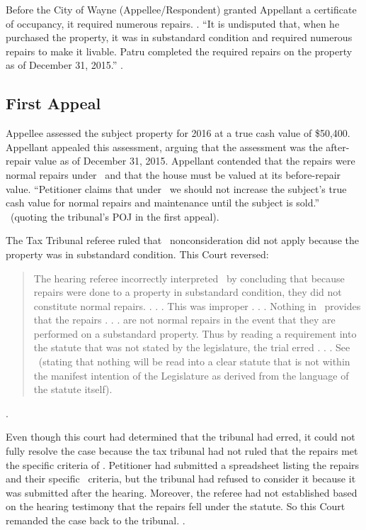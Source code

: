 \documentclass[12pt,\documentclassflag]{michiganCourtOfAppealsBrief}
\begin{document}
Before the City of Wayne (Appellee/Respondent) granted Appellant a certificate of occupancy, it required numerous repairs. \repairs. ``It is undisputed that, when he purchased the property, it was in substandard condition and required numerous repairs to make it livable. Patru completed the required repairs on the property as of December 31, 2015.'' .

\subsection{First Appeal}

Appellee assessed the subject property for 2016 at a true cash value of \$50,400. Appellant appealed this assessment, arguing that the assessment was the after-repair value as of December 31, 2015.
Appellant contended that the repairs were normal repairs under \mathieuGast\ and that the house must be valued at its before-repair value. 
``Petitioner claims that under \mathieuGast\ we should not increase the subject's true cash value for normal repairs and maintenance until the subject is sold.'' \ (quoting the tribunal's POJ in the first appeal).

The Tax Tribunal referee ruled that \mathieuGast\ nonconsideration did not apply because the property was in substandard condition.
This Court reversed:

\begin{quote}
  The hearing referee incorrectly interpreted \mathieuGast\ by concluding that because repairs were done to a property in substandard condition, they did not constitute normal repairs. . . . This was improper . . . Nothing in \mathieuGast\ provides that the repairs . . . are not normal repairs in the event that they are performed on a substandard property. Thus by reading a requirement into the statute that was not stated by the legislature, the trial erred . . . See \ (stating that nothing will be read into a clear statute that is not within the manifest intention of the Legislature as derived from the language of the statute itself).
\end{quote}
.

Even though this court had determined that the tribunal had erred, it could not fully resolve the case because the tax tribunal had not ruled that the repairs met the specific criteria of \mathieuGast. Petitioner had submitted a spreadsheet listing the repairs and their specific \mathieuGast\ criteria, but the tribunal had refused to consider it because it was submitted after the hearing.
Moreover, the referee had not established based on the hearing testimony that the repairs fell under the statute. So this Court remanded the case back to the tribunal.
.
\end{document}
